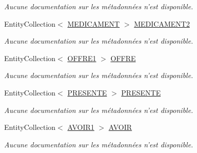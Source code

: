 \begin{DoxyCompactItemize}
\begin{DoxyCompactList}\small\item\em Aucune documentation sur les métadonnées n'est disponible. \end{DoxyCompactList}\item 
Entity\-Collection$<$ \hyperlink{class_model_1_1_m_e_d_i_c_a_m_e_n_t}{M\-E\-D\-I\-C\-A\-M\-E\-N\-T} $>$ \hyperlink{class_model_1_1_m_e_d_i_c_a_m_e_n_t_ab27f3343d5bdd58cfb9a866c3163fec3}{M\-E\-D\-I\-C\-A\-M\-E\-N\-T2}
\begin{DoxyCompactList}\small\item\em Aucune documentation sur les métadonnées n'est disponible. \end{DoxyCompactList}\item 
Entity\-Collection$<$ \hyperlink{class_model_1_1_o_f_f_r_e1}{O\-F\-F\-R\-E1} $>$ \hyperlink{class_model_1_1_m_e_d_i_c_a_m_e_n_t_a54e85fdea163abac71056ffc801917b5}{O\-F\-F\-R\-E}
\begin{DoxyCompactList}\small\item\em Aucune documentation sur les métadonnées n'est disponible. \end{DoxyCompactList}\item 
Entity\-Collection$<$ \hyperlink{class_model_1_1_p_r_e_s_e_n_t_e}{P\-R\-E\-S\-E\-N\-T\-E} $>$ \hyperlink{class_model_1_1_m_e_d_i_c_a_m_e_n_t_aac80ec949bc5827fed259a383066206d}{P\-R\-E\-S\-E\-N\-T\-E}
\begin{DoxyCompactList}\small\item\em Aucune documentation sur les métadonnées n'est disponible. \end{DoxyCompactList}\item 
Entity\-Collection$<$ \hyperlink{class_model_1_1_a_v_o_i_r1}{A\-V\-O\-I\-R1} $>$ \hyperlink{class_model_1_1_m_e_d_i_c_a_m_e_n_t_a16a5647738d2faf685e31fa4d4886bda}{A\-V\-O\-I\-R}
\begin{DoxyCompactList}\small\item\em Aucune documentation sur les métadonnées n'est disponible. \end{DoxyCompactList}\end{DoxyCompactItemize}


